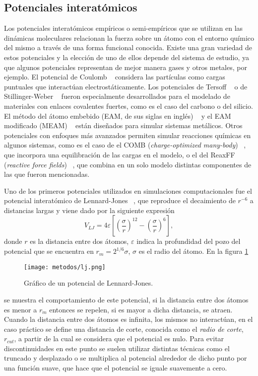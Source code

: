 \subsection{Potenciales interatómicos}

Los potenciales interatómicos empíricos o semi-empíricos que se utilizan en las
dinámicas moleculares relacionan la fuerza sobre un átomo con el entorno químico 
del mismo a través de una forma funcional conocida. Existe una gran 
variedad de estos potenciales y la elección de uno de ellos depende del sistema 
de estudio, ya que algunos potenciales representan de mejor manera gases y otros 
metales, por ejemplo. El potencial de Coulomb ~\cite{coulomb} considera las 
partículas como cargas puntuales que interactúan electrostáticamente. Los 
potenciales de Tersoff ~\cite{tersoff} o de Stillinger-Weber 
~\cite{stillinger-weber} fueron especialmente desarrollados para el modelado de 
materiales con enlaces covalentes fuertes, como es el caso del carbono o del 
silicio. El método del átomo embebido (EAM, de sus siglas en inglés) ~\cite{eam} 
y el EAM modificado (MEAM) ~\cite{meam} están diseñados para simular sistemas 
metálicos. Otros potenciales con enfoques más avanzados permiten simular
reacciones químicas en algunos sistemas, como es el caso de el COMB 
(\textit{charge-optimized many-body}) ~\cite{comb}, que incorpora una 
equilibración de las cargas en el modelo, o el del ReaxFF (\textit{reactive 
force fields}) ~\cite{reaxff}, que combina en un solo modelo distintas componentes
de las que fueron mencionadas.

Uno de los primeros potenciales utilizados en simulaciones computacionales fue 
el potencial interatómico de Lennard-Jones ~\cite{lennard-jones}, que reproduce 
el decaimiento de $r^{-6}$ a distancias largas y viene dado por la siguiente 
expresión
\begin{equation*}
V_{LJ} = 4\varepsilon \left[ \left( \frac{\sigma}{r} \right)^{12} - \left( \frac{\sigma}{r} \right)^{6} \right],
\end{equation*}
donde $r$ es la distancia entre dos átomos, $\varepsilon$ indica la profundidad 
del pozo del potencial que se encuentra en $r_m = 2^{1/6} \sigma$, $\sigma$ es el
radio del átomo. En la figura \ref{fig:lj} 
\begin{figure}
    \centering
    \texttt{[image: metodos/lj.png]}
    \caption{Gráfico de un potencial de Lennard-Jones.}
    \label{fig:lj}
\end{figure}
se muestra el comportamiento de este potencial, si la distancia entre dos
átomos es menor a $r_m$ entonces se repelen, si es mayor a dicha distancia, se 
atraen. Cuando la distancia entre dos átomos es infinita, los mismos no 
interactúan, en el caso práctico se define una distancia de corte, conocida como
el \textit{radio de corte}, $r_{cut}$, a partir de la cual se considera que el 
potencial es nulo. Para evitar discontinuidades en este punto se suelen utilizar 
distintas técnicas como el truncado y desplazado o se multiplica al potencial 
alrededor de dicho punto por una función suave, que hace que el potencial se 
iguale suavemente a cero.

